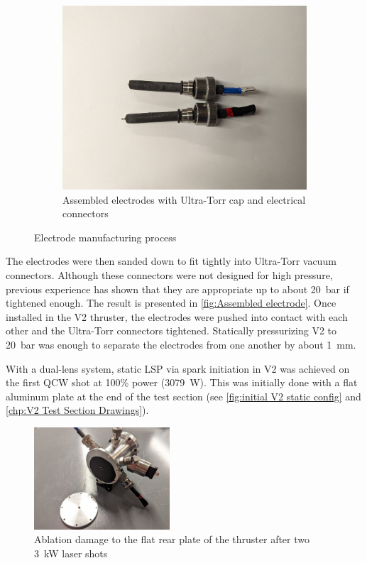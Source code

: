 \begin{figure}[!ht]
\begin{subfigure}[t]{0.30\textwidth}
        \centering
        \includegraphics[width=\textwidth]{assets/3 design/V2 electrodes.jpg}
        \caption{Assembled electrodes with Ultra-Torr cap and electrical connectors}
        \label{fig:Assembled electrode}
    \end{subfigure}

    \caption{Electrode manufacturing process}
\end{figure}

The electrodes were then sanded down to fit tightly into Ultra-Torr vacuum connectors. Although these connectors were not designed for high pressure, previous experience has shown that they are appropriate up to about \qty{20}{bar} if tightened enough. The result is presented in \autoref{fig:Assembled electrode}. Once installed in the V2 thruster, the electrodes were pushed into contact with each other and the Ultra-Torr connectors tightened. Statically pressurizing V2 to \qty{20}{bar} was enough to separate the electrodes from one another by about \qty{1}{mm}.

With a dual-lens system, static LSP via spark initiation in V2 was achieved on the first QCW shot at 100\% power (\qty{3079}{W}). This was initially done with a flat aluminum plate at the end of the test section (see \autoref{fig:initial V2 static config} and \autoref{chp:V2 Test Section Drawings}). 

\begin{figure}[!ht]
    \centering
    \includegraphics[width=0.45\textwidth]{assets/4 experiments/V2 test damage.jpg}
    \caption{Ablation damage to the flat rear plate of the thruster after two \qty{3}{kW} laser shots}
    \label{fig:initial V2 static config}
\end{figure}


